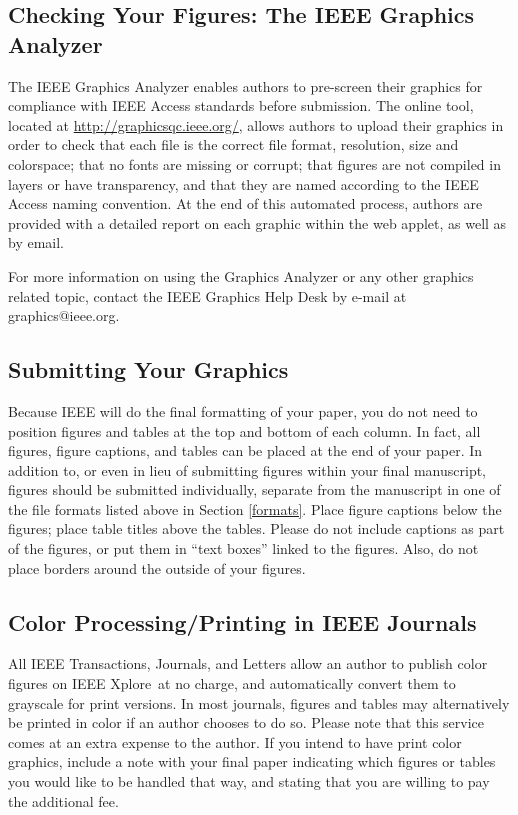 \documentclass{ieeeaccess}
\begin{document}
\subsection{Checking Your Figures: The IEEE Graphics Analyzer}
The IEEE Graphics Analyzer enables authors to pre-screen their graphics for 
compliance with IEEE Access standards before submission. 
The online tool, located at
\underline{http://graphicsqc.ieee.org/}, allows authors to 
upload their graphics in order to check that each file is the correct file 
format, resolution, size and colorspace; that no fonts are missing or 
corrupt; that figures are not compiled in layers or have transparency, and 
that they are named according to the IEEE Access naming 
convention. At the end of this automated process, authors are provided with 
a detailed report on each graphic within the web applet, as well as by 
email.

For more information on using the Graphics Analyzer or any other graphics 
related topic, contact the IEEE Graphics Help Desk by e-mail at 
graphics@ieee.org.

\subsection{Submitting Your Graphics}
Because IEEE will do the final formatting of your paper,
you do not need to position figures and tables at the top and bottom of each 
column. In fact, all figures, figure captions, and tables can be placed at 
the end of your paper. In addition to, or even in lieu of submitting figures 
within your final manuscript, figures should be submitted individually, 
separate from the manuscript in one of the file formats listed above in 
Section \ref{formats}. Place figure captions below the figures; place table titles 
above the tables. Please do not include captions as part of the figures, or 
put them in ``text boxes'' linked to the figures. Also, do not place borders 
around the outside of your figures.

\subsection{Color Processing/Printing in IEEE Journals}
All IEEE Transactions, Journals, and Letters allow an author to publish 
color figures on IEEE Xplore\textregistered\ at no charge, and automatically 
convert them to grayscale for print versions. In most journals, figures and 
tables may alternatively be printed in color if an author chooses to do so. 
Please note that this service comes at an extra expense to the author. If 
you intend to have print color graphics, include a note with your final 
paper indicating which figures or tables you would like to be handled that 
way, and stating that you are willing to pay the additional fee.
\end{document}
